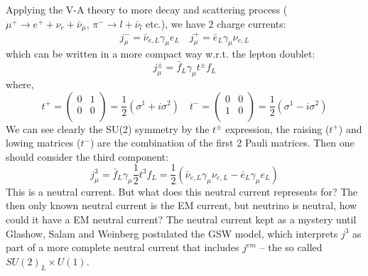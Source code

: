 Applying the V-A theory to more decay and scattering process (
$\mu^+ \rightarrow e^+ + \nu_e + \bar{\nu}_\mu$, $\pi^- \rightarrow l + \bar{\nu}_l$ etc.), 
we have 2 charge currents:
\begin{equation}
    j_\mu^- = \bar{\nu}_{e, L} \gamma_\mu e_L	\quad 
    j_\mu^+ = \bar{e}_L \gamma_\mu \nu_{e,L}
\end{equation}
which can be written in a more compact way w.r.t. the lepton doublet:
\begin{equation}
    j_\mu^\pm = \bar{f}_L \gamma_\mu t^\pm f_L
\end{equation}
where,
\begin{equation}
    t^+  =
    \begin{pmatrix}
	0   & 1	\\
	0   & 0	\\
    \end{pmatrix}
    = \frac{1}{2}(\sigma^1 + i\sigma^2)
    \quad
    t^-  =
    \begin{pmatrix}
	0   & 0	\\
	1   & 0	\\
    \end{pmatrix}
    = \frac{1}{2}(\sigma^1 - i\sigma^2)
\end{equation}
We can see clearly the SU(2) symmetry by the $t^\pm$ expression, the raising ($t^+$)
and lowing matrices ($t^-$) are the combination of the first 2 Pauli matrices.
Then one should consider the third component:
\begin{equation}
    j_\mu^3 = \bar{f}_L \gamma_\mu \frac{1}{2}t^3 f_L = \frac{1}{2} (\bar{\nu}_{e, L} \gamma_\mu \nu_{e, L} - \bar{e}_{L} \gamma_\mu e_L)
\end{equation}
This is a neutral current. But what does this neutral current represents for?
The then only known neutral current is the EM current, but neutrino is neutral, how
could it have a EM neutral current? The neutral current kept as a mystery until
Glashow, Salam and Weinberg postulated the GSW model, which interprets $j^3$ as
part of a more complete neutral current that includes $j^{em}$ -- the so called
$SU(2)_L \times U(1)$.

